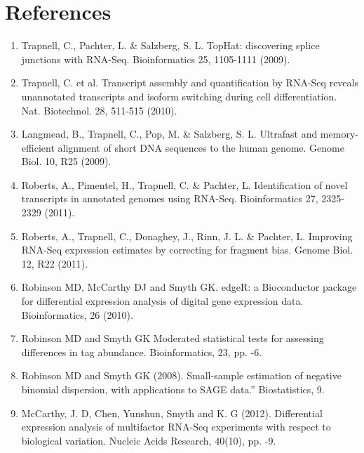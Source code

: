 \section{References}
\begin{enumerate}
  \item Trapnell, C., Pachter, L. \& Salzberg, S. L. TopHat: discovering splice
  junctions with RNA-Seq. Bioinformatics 25, 1105-1111 (2009).
  \item Trapnell, C. et al. Transcript assembly and quantification by RNA-Seq
  reveals unannotated transcripts and isoform switching during cell
  differentiation. Nat. Biotechnol. 28, 511-515 (2010).
  \item Langmead, B., Trapnell, C., Pop, M. \& Salzberg, S. L. Ultrafast and
  memory-efficient alignment of short DNA sequences to the human genome.
  Genome Biol. 10, R25 (2009).
  \item Roberts, A., Pimentel, H., Trapnell, C. \& Pachter, L. Identification
  of novel transcripts in annotated genomes using RNA-Seq. Bioinformatics 27,
  2325-2329 (2011).
  \item Roberts, A., Trapnell, C., Donaghey, J., Rinn, J. L. \& Pachter, L.
  Improving RNA-Seq expression estimates by correcting for fragment bias.
  Genome Biol. 12, R22 (2011).
  \item Robinson MD, McCarthy DJ and Smyth GK. edgeR: a Bioconductor package for 
  differential expression analysis of digital gene expression data.
  Bioinformatics, 26 (2010).
  \item Robinson MD and Smyth GK Moderated statistical tests for assessing 
  differences in tag abundance. Bioinformatics, 23, pp. -6.
  \item Robinson MD and Smyth GK (2008). Small-sample estimation of negative 
  binomial dispersion, with applications to SAGE data.” Biostatistics, 9.
  \item McCarthy, J. D, Chen, Yunshun, Smyth and K. G (2012). Differential 
  expression analysis of multifactor RNA-Seq experiments with respect to 
  biological variation. Nucleic Acids Research, 40(10), pp. -9.
\end{enumerate}
